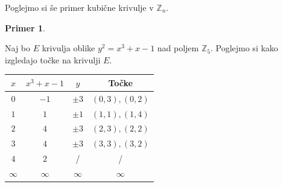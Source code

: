 \documentclass[12pt,a4paper,twoside]{article}
\theoremstyle{definition} %
\newtheorem{primer}[definicija]{Primer}
\theoremstyle{plain} %
\numberwithin{equation}{section}  %
\newcommand{\Z}{\mathbb Z}
\begin{document}
Poglejmo si še primer kubične krivulje v $\Z_n$.

\begin{primer}~

Naj bo $E$ krivulja oblike $y^2 = x^3+x-1$ nad poljem $\Z_5$. Poglejmo si kako izgledajo točke na krivulji $E$.

\begin{table}[H]
\centering
\begin{tabular}{c|c|c|c}
$x$      & $x^3+x-1$ & $y$      & Točke         \\ \hline
$0$      & $-1$      & $\pm 3$  & $(0,3),(0,2)$ \\
$1$      & $1$       & $\pm 1$  & $(1,1),(1,4)$ \\
$2$      & $4$       & $\pm 3$  & $(2,3),(2,2)$ \\
$3$      & $4$       & $\pm 3$  & $(3,3),(3,2)$ \\
$4$      & $2$       & /        & /             \\
$\infty$ & $\infty$  & $\infty$ & $\infty$     
\end{tabular}
\end{table}


\end{primer}
\end{document}
